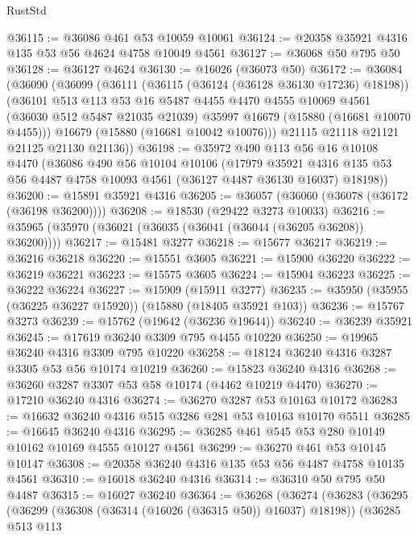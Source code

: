 \begin{lexlean}{RustStd}
\begin{coremodule}
@36115 := @36086 @461 @53 @10059 @10061
@36124 := @20358 @35921 @4316 @135 @53 @56 @4624 @4758 @10049 @4561
@36127 := @36068 @50 @795 @50
@36128 := @36127 @4624
@36130 := @16026 (@36073 @50)
@36172 := @36084
    (@36090
      (@36099
        (@36111
          (@36115 (@36124 (@36128 @36130 @17236) @18198))
          (@36101
            @513
            @113
            @53
            @16
            @5487
            @4455
            @4470
            @4555
            @10069
            @4561
            (@36030 @512 @5487 @21035 @21039)
            @35997
            @16679
            (@15880 (@16681 @10070 @4455)))
          @16679
          (@15880 (@16681 @10042 @10076)))
        @21115
        @21118
        @21121
        @21125
        @21130
        @21136))
@36198 := @35972
    @490
    @113
    @56
    @16
    @10108
    @4470
    (@36086
      @490
      @56
      @10104
      @10106
      (@17979
        @35921
        @4316
        @135
        @53
        @56
        @4487
        @4758
        @10093
        @4561
        (@36127 @4487 @36130 @16037)
        @18198))
@36200 := @15891 @35921 @4316
@36205 := @36057 (@36060 (@36078 (@36172 (@36198 @36200))))
@36208 := @18530 (@29422 @3273 @10033)
@36216 := @35965 (@35970 (@36021 (@36035 (@36041 (@36044 (@36205 @36208)) @36200))))
@36217 := @15481 @3277
@36218 := @15677 @36217
@36219 := @36216 @36218
@36220 := @15551 @3605
@36221 := @15900 @36220
@36222 := @36219 @36221
@36223 := @15575 @3605
@36224 := @15904 @36223
@36225 := @36222 @36224
@36227 := @15909 (@15911 @3277)
@36235 := @35950 (@35955 (@36225 @36227 @15920)) (@15880 (@18405 @35921 @103))
@36236 := @15767 @3273
@36239 := @15762 (@19642 (@36236 @19644))
@36240 := @36239 @35921
@36245 := @17619 @36240 @3309 @795 @4455 @10220
@36250 := @19965 @36240 @4316 @3309 @795 @10220
@36258 := @18124 @36240 @4316 @3287 @3305 @53 @56 @10174 @10219
@36260 := @15823 @36240 @4316
@36268 := @36260 @3287 @3307 @53 @58 @10174 (@4462 @10219 @4470)
@36270 := @17210 @36240 @4316
@36274 := @36270 @3287 @53 @10163 @10172
@36283 := @16632 @36240 @4316 @515 @3286 @281 @53 @10163 @10170 @5511
@36285 := @16645 @36240 @4316
@36295 := @36285 @461 @545 @53 @280 @10149 @10162 @10169 @4555 @10127 @4561
@36299 := @36270 @461 @53 @10145 @10147
@36308 := @20358 @36240 @4316 @135 @53 @56 @4487 @4758 @10135 @4561
@36310 := @16018 @36240 @4316
@36314 := @36310 @50 @795 @50 @4487
@36315 := @16027 @36240
@36364 := @36268
    (@36274
      (@36283
        (@36295
          (@36299 (@36308 (@36314 (@16026 (@36315 @50)) @16037) @18198))
          (@36285
            @513
            @113

\end{coremodule}
\end{lexlean}
